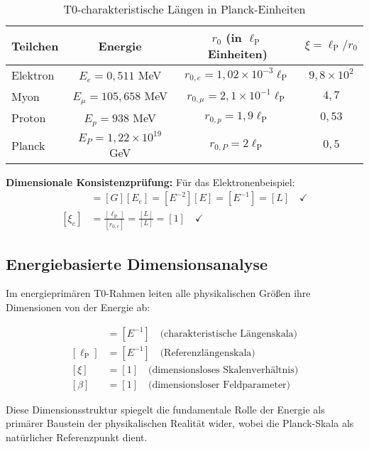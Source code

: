 \documentclass[12pt,a4paper]{report}
\newcommand{\lP}{\ell_{\text{P}}}         %
\newcommand{\rzero}{r_0}                  %
\begin{document}
	\begin{table}[htbp]
		\centering
		\begin{tabular}{lccc}
			\toprule
			\textbf{Teilchen} & \textbf{Energie} & \textbf{$\rzero$ (in $\lP$ Einheiten)} & \textbf{$\xi = \lP/\rzero$} \\
			\midrule
			Elektron & $E_e = 0,511$ MeV & $r_{0,e} = 1,02 \times 10^{-3} \lP$ & $9,8 \times 10^{2}$ \\
			Myon & $E_\mu = 105,658$ MeV & $r_{0,\mu} = 2,1 \times 10^{-1} \lP$ & $4,7$ \\
			Proton & $E_p = 938$ MeV & $r_{0,p} = 1,9 \lP$ & $0,53$ \\
			Planck & $E_P = 1,22 \times 10^{19}$ GeV & $r_{0,P} = 2\lP$ & $0,5$ \\
			\bottomrule
		\end{tabular}
		\caption{T0-charakteristische Längen in Planck-Einheiten}
		\label{tab:t0_scales_planck}
	\end{table}
	
	\textbf{Dimensionale Konsistenzprüfung:}
	Für das Elektronenbeispiel:
	\begin{align}
		[r_{0,e}] &= [G][E_e] = [E^{-2}][E] = [E^{-1}] = [L] \quad \checkmark \\
		[\xi_{e}] &= \frac{[\lP]}{[r_{0,e}]} = \frac{[L]}{[L]} = [1] \quad \checkmark
	\end{align}
	
	\subsection{Energiebasierte Dimensionsanalyse}\label{subsec:energy_dimensional_analysis}
	
	Im energieprimären T0-Rahmen leiten alle physikalischen Größen ihre Dimensionen von der Energie ab:
	
	\begin{align}
		[\rzero] &= [E^{-1}] \quad \text{(charakteristische Längenskala)} \\
		[\lP] &= [E^{-1}] \quad \text{(Referenzlängenskala)} \\
		[\xi] &= [1] \quad \text{(dimensionsloses Skalenverhältnis)} \\
		[\beta] &= [1] \quad \text{(dimensionsloser Feldparameter)}
	\end{align}
	
	Diese Dimensionsstruktur spiegelt die fundamentale Rolle der Energie als primärer Baustein der physikalischen Realität wider, wobei die Planck-Skala als natürlicher Referenzpunkt dient.
	
\end{document}
